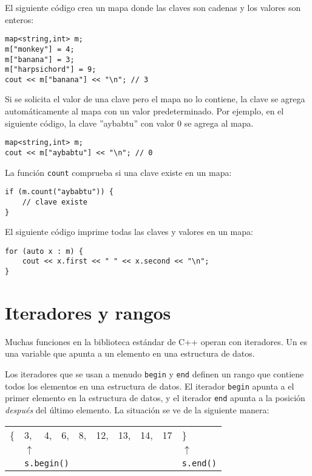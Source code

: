 El siguiente código crea un mapa
donde las claves son cadenas y los valores son enteros:

\begin{lstlisting}
map<string,int> m;
m["monkey"] = 4;
m["banana"] = 3;
m["harpsichord"] = 9;
cout << m["banana"] << "\n"; // 3
\end{lstlisting}

Si se solicita el valor de una clave
pero el mapa no lo contiene,
la clave se agrega automáticamente al mapa con
un valor predeterminado.
Por ejemplo, en el siguiente código,
la clave ''aybabtu'' con valor 0
se agrega al mapa.

\begin{lstlisting}
map<string,int> m;
cout << m["aybabtu"] << "\n"; // 0
\end{lstlisting}
La función \texttt{count} comprueba
si una clave existe en un mapa:
\begin{lstlisting}
if (m.count("aybabtu")) {
    // clave existe
}
\end{lstlisting}
El siguiente código imprime todas las claves y valores
en un mapa:
\begin{lstlisting}
for (auto x : m) {
    cout << x.first << " " << x.second << "\n";
}
\end{lstlisting}

\section{Iteradores y rangos}


Muchas funciones en la biblioteca estándar de C++
operan con iteradores.
Un  es una variable que apunta
a un elemento en una estructura de datos.

Los iteradores que se usan a menudo \texttt{begin}
y \texttt{end} definen un rango que contiene
todos los elementos en una estructura de datos.
El iterador \texttt{begin} apunta a
el primer elemento en la estructura de datos,
y el iterador \texttt{end} apunta a
la posición \emph{después} del último elemento.
La situación se ve de la siguiente manera:

\begin{center}
\begin{tabular}{llllllllll}
\{ & 3, & 4, & 6, & 8, & 12, & 13, & 14, & 17 & \} \\
& $\uparrow$ & & & & & & & & $\uparrow$ \\
& \multicolumn{3}{l}{\texttt{s.begin()}} & & & & & & \texttt{s.end()} \\
\end{tabular}
\end{center}

